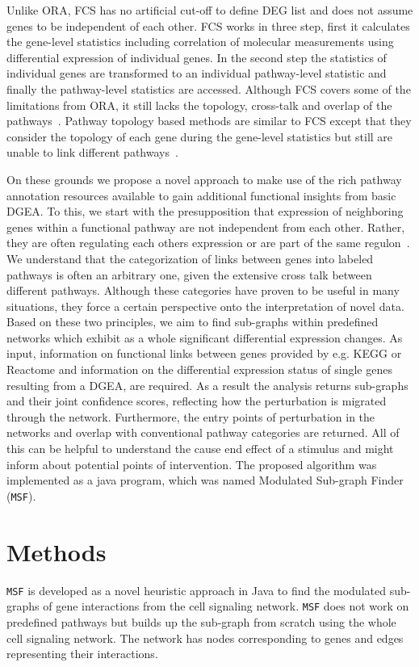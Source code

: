 \documentclass[twocolumn]{article}
\begin{document}
Unlike ORA, FCS has no artificial cut-off to define DEG list and does
not assume genes to be independent of each other. FCS works in three
step, first it calculates the gene-level statistics including correlation of molecular measurements  using differential expression of individual genes. In the second step the statistics of individual genes are transformed to an individual pathway-level statistic and finally the
pathway-level statistics are accessed. Although FCS covers some of the
limitations from ORA, it still lacks the topology, cross-talk and
overlap of the pathways~\cite{Khatri2012,Campos}. Pathway topology
based methods are similar to FCS except that they consider the
topology of each gene during the gene-level
statistics but still are unable to link different pathways~\cite{Khatri2012}.

On these grounds we propose a novel approach to make use of the rich
pathway annotation resources available to gain additional functional
insights from basic DGEA. To this, we
start with the presupposition that expression of neighboring genes
within a functional pathway are not independent from each
other. Rather, they are often regulating each others expression or are
part of the same regulon~\cite{Michalak}. We
understand that the categorization of links between genes into labeled
pathways is often an arbitrary one, given the extensive cross talk
between different pathways. Although these categories have proven to be
useful in many situations, they force a certain perspective onto the
interpretation of novel data. Based on these two principles, we aim to
find sub-graphs within predefined networks which exhibit as a whole
significant differential expression changes. As input, information on
functional links between genes provided by e.g. KEGG or Reactome and
information on the differential expression status of single genes
resulting from a DGEA, are required. As a result the analysis returns
sub-graphs and their joint confidence scores, reflecting how the
perturbation is migrated through the network. Furthermore, the entry
points of perturbation in the networks and overlap with conventional
pathway categories are returned. All of this can be helpful to
understand the cause end effect of a stimulus and might inform about
potential points of intervention. The proposed algorithm was
implemented as a java program, which was named Modulated Sub-graph
Finder (\texttt{MSF}).

\section*{Methods}
\texttt{MSF} is developed as a novel heuristic approach in Java to
find the modulated sub-graphs of gene interactions from the cell
signaling network. \texttt{MSF} does not work on predefined pathways but builds up the sub-graph from scratch using the whole cell signaling network. The network has nodes corresponding to genes and
edges representing their interactions. 
\end{document}
